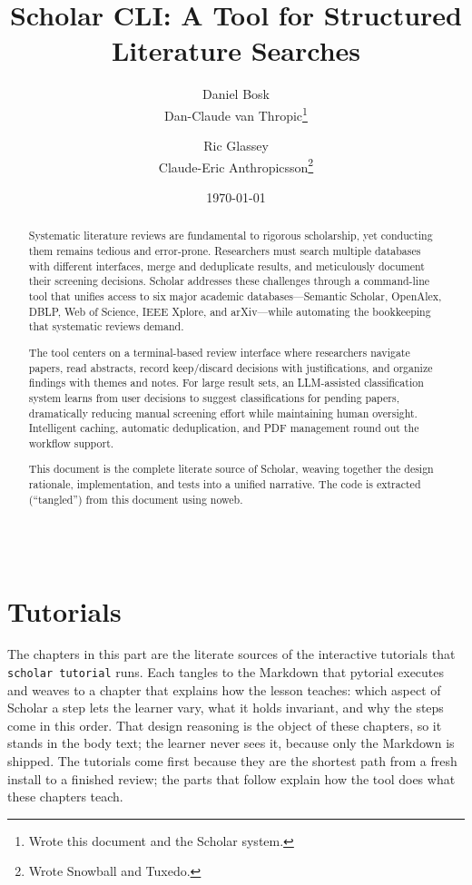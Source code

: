\documentclass[a4paper,oneside]{memoir}
\title{Scholar CLI: A Tool for Structured Literature Searches}
\author{Daniel Bosk\\Dan-Claude van Thropic\thanks{%
    Wrote this document and the Scholar system.
  } \and
  Ric Glassey\\Claude-Eric Anthropicsson\thanks{%
    Wrote Snowball and Tuxedo.
  }
}
\date{\today}
\begin{document}
\frontmatter
\maketitle

\begin{abstract}
Systematic literature reviews are fundamental to rigorous scholarship, yet
conducting them remains tedious and error-prone.
Researchers must search multiple databases with different interfaces, merge
and deduplicate results, and meticulously document their screening decisions.
Scholar addresses these challenges through a command-line tool that unifies
access to six major academic databases---Semantic Scholar, OpenAlex, DBLP,
Web of Science, IEEE Xplore, and arXiv---while automating the bookkeeping that
systematic reviews demand.

The tool centers on a terminal-based review interface where researchers
navigate papers, read abstracts, record keep/discard decisions with
justifications, and organize findings with themes and notes.
For large result sets, an LLM-assisted classification system learns from
user decisions to suggest classifications for pending papers, dramatically
reducing manual screening effort while maintaining human oversight.
Intelligent caching, automatic deduplication, and PDF management round out
the workflow support.

This document is the complete literate source of Scholar, weaving together
the design rationale, implementation, and tests into a unified narrative.
The code is extracted (``tangled'') from this document using noweb.
\end{abstract}
\vfill
\inputminted[linenos=false]{text}{../LICENSE}

\clearpage
\tableofcontents*

\mainmatter



\part{Tutorials}

The chapters in this part are the literate sources of the interactive
tutorials that \texttt{scholar tutorial} runs.
Each tangles to the Markdown that pytorial executes and weaves to a
chapter that explains how the lesson teaches: which aspect of Scholar a
step lets the learner vary, what it holds invariant, and why the steps
come in this order.
That design reasoning is the object of these chapters, so it stands in
the body text; the learner never sees it, because only the Markdown is
shipped.
The tutorials come first because they are the shortest path from a fresh
install to a finished review; the parts that follow explain how the tool
does what these chapters teach.
\end{document}
